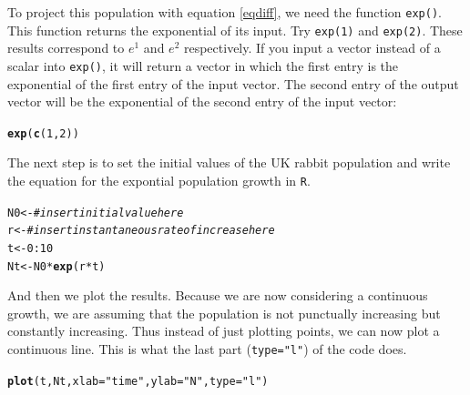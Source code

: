 \documentclass{article}\usepackage[]{graphicx}\usepackage[]{color}
\makeatletter
\newcommand{\hlnum}[1]{\textcolor[rgb]{0.686,0.059,0.569}{#1}}%
\newcommand{\hlstr}[1]{\textcolor[rgb]{0.192,0.494,0.8}{#1}}%
\newcommand{\hlcom}[1]{\textcolor[rgb]{0.678,0.584,0.686}{\textit{#1}}}%
\newcommand{\hlopt}[1]{\textcolor[rgb]{0,0,0}{#1}}%
\newcommand{\hlstd}[1]{\textcolor[rgb]{0.345,0.345,0.345}{#1}}%
\newcommand{\hlkwb}[1]{\textcolor[rgb]{0.69,0.353,0.396}{#1}}%
\newcommand{\hlkwc}[1]{\textcolor[rgb]{0.333,0.667,0.333}{#1}}%
\newcommand{\hlkwd}[1]{\textcolor[rgb]{0.737,0.353,0.396}{\textbf{#1}}}%
\newenvironment{kframe}{%
 \def\at@end@of@kframe{}%
 \ifinner\ifhmode%
  \def\at@end@of@kframe{\end{minipage}}%
  \begin{minipage}{\columnwidth}%
 \fi\fi%
 \def\FrameCommand##1{\hskip\@totalleftmargin \hskip-\fboxsep
 \colorbox{shadecolor}{##1}\hskip-\fboxsep
     \hskip-\linewidth \hskip-\@totalleftmargin \hskip\columnwidth}%
 \MakeFramed {\advance\hsize-\width
   \@totalleftmargin\z@ \linewidth\hsize
   \@setminipage}}%
 {\par\unskip\endMakeFramed%
 \at@end@of@kframe}
\newenvironment{knitrout}{}{} %
\makeatother
\begin{document}
To project this population with equation \ref{eqdiff}, we need the function \texttt{exp()}. This function returns the exponential of its input. Try \texttt{exp(1)} and \texttt{exp(2)}. These results correspond to $e^1$ and $e^2$ respectively. If you input a vector instead of a scalar into \texttt{exp()}, it will return a vector in which the first entry is the exponential of the first entry of the input vector. The second entry of the output vector will be the exponential of the second entry of the input vector:
\begin{knitrout}
\color{fgcolor}\begin{kframe}
\begin{alltt}
\hlkwd{exp}\hlstd{(}\hlkwd{c}\hlstd{(}\hlnum{1}\hlstd{,}\hlnum{2}\hlstd{))}
\end{alltt}
\end{kframe}
\end{knitrout}
The next step is to set the initial values of the UK rabbit population and write the equation for the expontial population growth in \texttt{R}.
\begin{knitrout}
\color{fgcolor}\begin{kframe}
\begin{alltt}
\hlstd{N0}\hlkwb{<-} \hlcom{#insert initial value here}
\hlstd{r}\hlkwb{<-}  \hlcom{#insert instantaneous rate of increase here }
\hlstd{t}\hlkwb{<-}\hlnum{0}\hlopt{:}\hlnum{10}
\hlstd{Nt}\hlkwb{<-}\hlstd{N0}\hlopt{*}\hlkwd{exp}\hlstd{(r}\hlopt{*}\hlstd{t)}
\end{alltt}
\end{kframe}
\end{knitrout}
And then we plot the results. Because we are now considering a continuous growth, we are assuming that the population is not punctually increasing but constantly increasing. Thus instead of just plotting points, we can now plot a continuous line. This is what the last part (\verb+type="l"+) of the code does.
\begin{knitrout}
\color{fgcolor}\begin{kframe}
\begin{alltt}
\hlkwd{plot}\hlstd{(t, Nt,} \hlkwc{xlab}\hlstd{=}\hlstr{"time"}\hlstd{,} \hlkwc{ylab}\hlstd{=}\hlstr{"N"}\hlstd{,} \hlkwc{type}\hlstd{=}\hlstr{"l"}\hlstd{)}
\end{alltt}
\end{kframe}
\end{knitrout}
\end{document}
